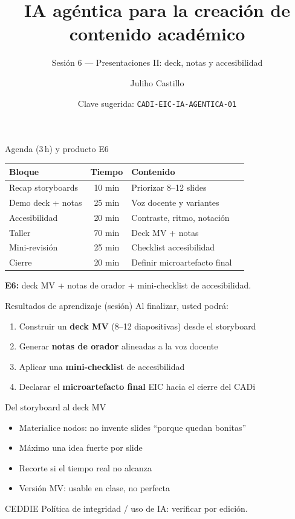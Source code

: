 \documentclass[aspectratio=169,11pt]{beamer}
\title{IA agéntica para la creación de contenido académico}
\subtitle{Sesión 6 --- Presentaciones II: deck, notas y accesibilidad}
\author{Juliho Castillo}
\institute{CADi 40\,h · Escuela de Ingeniería y Ciencias\\
Tecnológico de Monterrey}
\date{Clave sugerida: \texttt{CADI-EIC-IA-AGENTICA-01}}
\begin{document}
\begin{frame}
\titlepage
\end{frame}

\begin{frame}{Agenda (3\,h) y producto E6}
\begin{tabularx}{\textwidth}{@{}lclX@{}}
\toprule
Bloque & Tiempo & Contenido \\
\midrule
Recap storyboards & 10 min & Priorizar 8--12 slides \\
Demo deck + notas & 25 min & Voz docente y variantes \\
Accesibilidad & 20 min & Contraste, ritmo, notación \\
Taller & 70 min & Deck MV + notas \\
Mini-revisión & 25 min & Checklist accesibilidad \\
Cierre & 20 min & Definir microartefacto final \\
\bottomrule
\end{tabularx}
\vspace{0.5em}
\textbf{E6:} deck MV + notas de orador + mini-checklist de accesibilidad.
\end{frame}

\begin{frame}{Resultados de aprendizaje (sesión)}
Al finalizar, usted podrá:
\begin{enumerate}
\item Construir un \textbf{deck MV} (8--12 diapositivas) desde el storyboard
\item Generar \textbf{notas de orador} alineadas a la voz docente
\item Aplicar una \textbf{mini-checklist} de accesibilidad
\item Declarar el \textbf{microartefacto final} EIC hacia el cierre del CADi
\end{enumerate}
\end{frame}

\begin{frame}{Del storyboard al deck MV}
\begin{itemize}
\item Materialice nodos: no invente slides ``porque quedan bonitas''
\item Máximo una idea fuerte por slide
\item Recorte si el tiempo real no alcanza
\item Versión MV: usable en clase, no perfecta
\end{itemize}
\begin{block}{CEDDIE}
Política de integridad / uso de IA: verificar por edición.
\end{block}
\end{frame}
\end{document}
